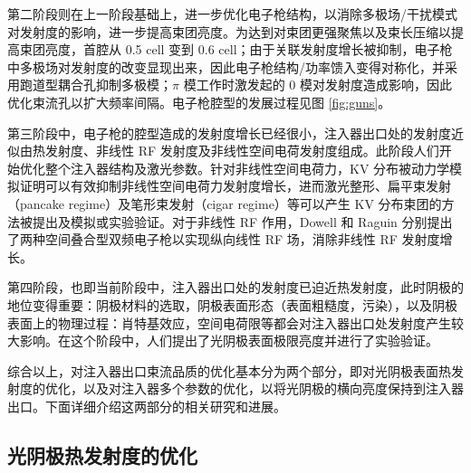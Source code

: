第二阶段则在上一阶段基础上，进一步优化电子枪结构，以消除多极场/干扰模式对发射度的影响，进一步提高束团亮度。为达到对束团更强聚焦以及束长压缩以提高束团亮度，首腔从 0.5 cell 变到 0.6 cell\cite{Lehrman:1992aa}；由于关联发射度增长被抑制，电子枪中多极场对发射度的改变显现出来，因此电子枪结构/功率馈入变得对称化\cite{Palmer:1998aa}，并采用跑道型耦合孔抑制多极模\cite{Limborg:2005vn, Akre:2008aa}；$\pi$ 模工作时激发起的 0 模对发射度造成影响，因此优化束流孔以扩大频率间隔\cite{Palmer:1998aa}。电子枪腔型的发展过程见图 \ref{fig:guns}。

第三阶段中，电子枪的腔型造成的发射度增长已经很小，注入器出口处的发射度近似由热发射度、非线性 RF 发射度及非线性空间电荷发射度组成\cite{Qiu:1996aa}。此阶段人们开始优化整个注入器结构及激光参数。针对非线性空间电荷力，KV 分布\cite{Kapchinskij:1959aa}被动力学模拟证明可以有效抑制非线性空间电荷力发射度增长\cite{Limborg-Deprey:2006aa,Khojoyan:2013aa}，进而激光整形、扁平束发射（pancake regime）\cite{bazarov2009maximum}及笔形束发射（cigar regime）\cite{filippetto2014maximum}等可以产生 KV 分布束团的方法被提出及模拟或实验验证\cite{Khojoyan:2013aa,Khojoyan:2014aa,Musumeci:2008ab,Li:2012aa}。对于非线性 RF 作用，Dowell 和 Raguin 分别提出了两种空间叠合型双频电子枪\cite{Dowell:2004aa,Raguin:2005aa}以实现纵向线性 RF 场，消除非线性 RF 发射度增长。

第四阶段，也即当前阶段中，注入器出口处的发射度已迫近热发射度\cite{li2012multi,gulliford2013demonstration,karkare2011effect,karkare2015effects}，此时阴极的地位变得重要：阴极材料的选取\cite{Cultrera:2014ab}，阴极表面形态（表面粗糙度，污染）\cite{Vecchione:2012aa,Vecchione:2013aa,Ling:2013aa}，以及阴极表面上的物理过程：肖特基效应，空间电荷限等都会对注入器出口处发射度产生较大影响\cite{qian2012experimental}。在这个阶段中，人们提出了光阴极表面极限亮度并进行了实验验证\cite{bazarov2009maximum,filippetto2014maximum}。

综合以上，对注入器出口束流品质的优化基本分为两个部分，即对光阴极表面热发射度的优化，以及对注入器多个参数的优化，以将光阴极的横向亮度保持到注入器出口。下面详细介绍这两部分的相关研究和进展。

\subsection{光阴极热发射度的优化}
